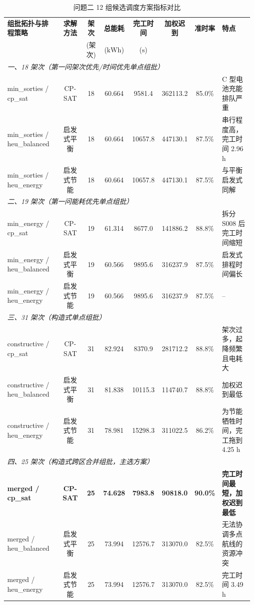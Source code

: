 \documentclass[withoutpreface,bwprint]{format}
\begin{document}
\begin{table}[H]
\centering
\small
\caption{问题二 12 组候选调度方案指标对比}
\label{tab:candidates_comparison_q2}
\begin{tabularx}{\textwidth}{l c c c c c c >{\raggedright\arraybackslash}X}
\toprule
\textbf{组批拓扑与排程策略} & \textbf{求解方法} & \textbf{架次} & \textbf{总能耗} & \textbf{完工时间} & \textbf{加权迟到} & \textbf{准时率} & \textbf{特点} \\
& & (架次) & ($\text{kWh}$) & ($\text{s}$) & & & \\
\midrule
\multicolumn{8}{l}{\textit{一、18 架次（第一问架次优先/时间优先单点组批）}} \\
min\_sorties / cp\_sat & CP-SAT & 18 & 60.664 & 9581.4 & 362113.2 & 85.0\% & C 型电池充能排队严重 \\
min\_sorties / heu\_balanced & 启发式平衡 & 18 & 60.664 & 10657.8 & 447130.1 & 87.5\% & 串行程度高，完工时间 2.96 h \\
min\_sorties / heu\_energy & 启发式节能 & 18 & 60.664 & 10657.8 & 447130.1 & 87.5\% & 与平衡启发式同解 \\
\midrule
\multicolumn{8}{l}{\textit{二、19 架次（第一问能耗优先单点组批）}} \\
min\_energy / cp\_sat & CP-SAT & 19 & 61.314 & 8677.0 & 141886.2 & 88.8\% & 拆分 S008 后完工时间缩短 \\
min\_energy / heu\_balanced & 启发式平衡 & 19 & 60.566 & 9895.6 & 316237.9 & 87.5\% & 启发式排程时间偏长 \\
min\_energy / heu\_energy & 启发式节能 & 19 & 60.566 & 9895.6 & 316237.9 & 87.5\% & -- \\
\midrule
\multicolumn{8}{l}{\textit{三、31 架次（构造式单点组批）}} \\
constructive / cp\_sat & CP-SAT & 31 & 82.924 & 8370.9 & 281712.2 & 88.8\% & 架次过多，起降频繁且电耗大 \\
constructive / heu\_balanced & 启发式平衡 & 31 & 81.838 & 10115.3 & 114740.7 & 88.8\% & 加权迟到最低 \\
constructive / heu\_energy & 启发式节能 & 31 & 78.981 & 15298.3 & 311022.5 & 86.2\% & 为节能牺牲时间，完工拖到 4.25 h \\
\midrule
\multicolumn{8}{l}{\textit{四、25 架次（构造式跨区合并组批，主选方案）}} \\
\textbf{merged / cp\_sat} & \textbf{CP-SAT} & \textbf{25} & \textbf{74.628} & \textbf{7983.8} & \textbf{90818.0} & \textbf{90.0\%} & \textbf{完工时间最短，加权迟到最低} \\
merged / heu\_balanced & 启发式平衡 & 25 & 73.994 & 12576.7 & 313070.0 & 82.5\% & 无法协调多点航线的资源冲突 \\
merged / heu\_energy & 启发式节能 & 25 & 73.994 & 12576.7 & 313070.0 & 82.5\% & 完工时间 3.49 h \\
\bottomrule
\end{tabularx}
\end{table}
\end{document}
